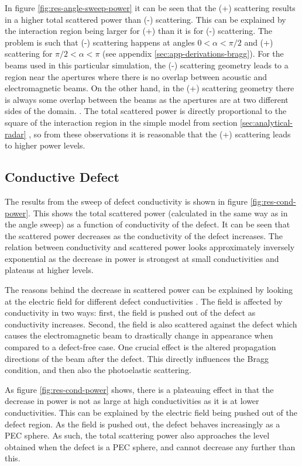 \documentclass[11pt,twoside]{eitExjobb}
\begin{document}
	In figure \ref{fig:res-angle-sweep-power} it can be seen that the (+) scattering results in a higher total scattered power than (-) scattering. This can be explained by the interaction region being larger for (+) than it is for (-) scattering. The problem is such that (-) scattering happens at angles $0 < \alpha < \pi/2$ and (+) scattering for $\pi/2 < \alpha < \pi$ (see appendix \ref{sec:app-derivations-bragg}). For the beams used in this particular simulation, the (-) scattering geometry leads to a region near the apertures where there is no overlap between acoustic and electromagnetic beams. On the other hand, in the (+) scattering geometry there is always some overlap between the beams as the apertures are at two different sides of the domain. . The total scattered power is directly proportional to the square of the interaction region in the simple model from section \ref{sec:analytical-radar} , so from these observations it is reasonable that the (+) scattering leads to higher power levels. 
	
	\subsection{Conductive Defect}
	The results from the sweep of defect conductivity is shown in figure \ref{fig:res-cond-power}. This shows the total scattered power (calculated in the same way as in the angle sweep) as a function of conductivity of the defect. It can be seen that the scattered power decreases as the conductivity of the defect increases. The relation between conductivity and scattered power looks approximately inversely exponential as the decrease in power is strongest at small conductivities and plateaus at higher levels.
	
	The reasons behind the decrease in scattered power can be explained by looking at the electric field for different defect conductivities . The field is affected by conductivity in two ways: first, the field is pushed out of the defect as conductivity increases. Second, the field is also scattered against the defect which causes the electromagnetic beam to drastically change in appearance when compared to a defect-free case. One crucial effect is the altered propagation directions of the beam after the defect. This directly influences the Bragg condition, and then also the photoelastic scattering.
	
	As figure \ref{fig:res-cond-power} shows, there is a plateauing effect in that the decrease in power is not as large at high conductivities as it is at lower conductivities. This can be explained by the electric field being pushed out of the defect region. As the field is pushed out, the defect behaves increasingly as a PEC sphere. As such, the total scattering power also approaches the level obtained when the defect is a PEC sphere, and cannot decrease any further than this. 
	
\end{document}
